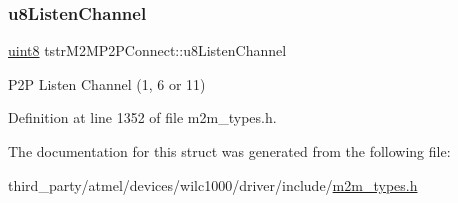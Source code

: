 \mbox{\label{structtstrM2MP2PConnect_a6c92e28e2b614f6f024cc69d2da27c51}} 
\subsubsection{\texorpdfstring{u8\+Listen\+Channel}{u8ListenChannel}}
{\footnotesize\ttfamily \hyperlink{group__DataT_ga4df709a77647e870bbf1d955b8edc9a6}{uint8} tstr\+M2\+M\+P2\+P\+Connect\+::u8\+Listen\+Channel}

P2P Listen Channel (1, 6 or 11) 

Definition at line 1352 of file m2m\+\_\+types.\+h.



The documentation for this struct was generated from the following file\+:\begin{DoxyCompactItemize}
\item 
third\+\_\+party/atmel/devices/wilc1000/driver/include/\hyperlink{m2m__types_8h}{m2m\+\_\+types.\+h}\end{DoxyCompactItemize}
